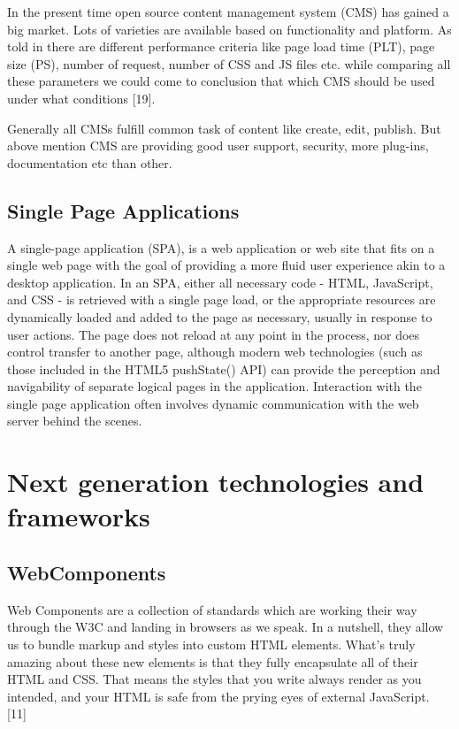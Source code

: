 \documentclass{sig-alternate}
\begin{document}
In the present time open source content management system (CMS) has gained a big market. Lots of varieties are available based on functionality and platform.
As told in there are different performance criteria like page load time (PLT), page size (PS), number of request, number of CSS and JS files etc. while comparing all these parameters we could come to conclusion that which CMS should be used under what conditions [19].

Generally all CMSs fulfill common task of content like create, edit, publish. But above mention CMS are providing good user support, security, more plug-ins, documentation etc than other.

\subsection{Single Page Applications}

A single-page application (SPA), is a web application or web site that fits on a single web page with the goal of providing a more fluid user experience akin to a desktop application. In an SPA, either all necessary code - HTML, JavaScript, and CSS - is retrieved with a single page load, or the appropriate resources are dynamically loaded and added to the page as necessary, usually in response to user actions. The page does not reload at any point in the process, nor does control transfer to another page, although modern web technologies (such as those included in the HTML5 pushState() API) can provide the perception and navigability of separate logical pages in the application. Interaction with the single page application often involves dynamic communication with the web server behind the scenes.

\section{Next generation technologies and frameworks}

\subsection{WebComponents}

Web Components are a collection of standards which are working their way through the W3C and landing in browsers as we speak. In a nutshell, they allow us to bundle markup and styles into custom HTML elements. What's truly amazing about these new elements is that they fully encapsulate all of their HTML and CSS. That means the styles that you write always render as you intended, and your HTML is safe from the prying eyes of external JavaScript. [11]
\end{document}
